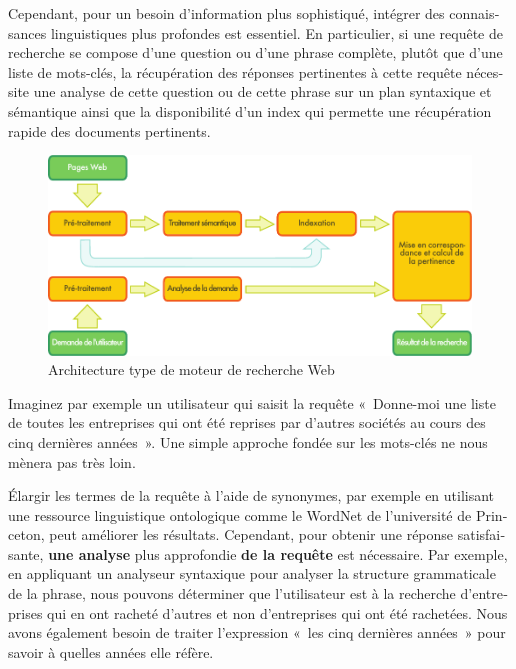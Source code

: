 \begin{french}
\begin{multicols}{2}
Cependant, pour un besoin d'information plus sophistiqué, intégrer des
connaissances linguistiques plus profondes est essentiel. En
particulier, si une requête de recherche se compose d'une question ou
d'une phrase complète, plutôt que d'une liste de mots-clés, la
récupération des réponses pertinentes à cette requête nécessite une
analyse de cette question ou de cette phrase sur un plan syntaxique et
sémantique ainsi que la disponibilité d'un index qui permette une
récupération rapide des documents pertinents.

\begin{figure}[t]
\begin{center}
 \includegraphics[width=\textwidth]{../_media/french/web_search_architecture}
 \caption{Architecture type de moteur de recherche Web}
\label{fig:archiweb}
\end{center}
\end{figure}

Imaginez par exemple un utilisateur qui saisit la requête «~Donne-moi
une liste de toutes les entreprises qui ont été reprises par d'autres
sociétés au cours des cinq dernières années~». Une simple approche
fondée sur les mots-clés ne nous mènera pas très loin.

Élargir les termes de la requête à l'aide de synonymes, par exemple en
utilisant une ressource linguistique ontologique comme le WordNet de
l'université de Princeton, peut améliorer les résultats. Cependant, pour obtenir une
réponse satisfaisante, {\bf une analyse} plus approfondie {\bf de la requête} est
nécessaire. Par exemple, en appliquant un analyseur syntaxique pour
analyser la structure grammaticale de la phrase, nous pouvons
déterminer que l'utilisateur est à la recherche d'entreprises qui en
ont racheté d'autres et non d'entreprises qui ont été rachetées. Nous
avons également besoin de traiter l'expression «~les cinq dernières
  années~» pour savoir à quelles années elle réfère.


\end{multicols}
\end{french}
